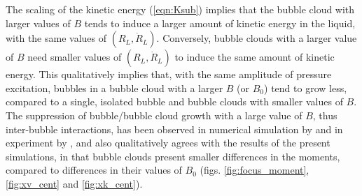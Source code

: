 \documentclass{jfm}
\begin{document}
The scaling of the kinetic energy (\ref{eqn:Ksub}) implies that the bubble cloud with larger values of $B$ tends to induce a larger amount of kinetic energy in the liquid, with the same values of $(R_L,\dot{R}_L)$.
Conversely, bubble clouds with a larger value of $B$ need smaller values of $(R_L,\dot{R}_L)$ to induce the same amount of kinetic energy. 
This qualitatively implies that, with the same amplitude of pressure excitation, bubbles in a bubble cloud with a larger $B$ (or $B_0$) tend to grow less, compared to a single, isolated bubble and bubble clouds with smaller values of $B$.
The suppression of bubble/bubble cloud growth with a large value of $B$, thus inter-bubble interactions, has been observed in numerical simulation by \citet{Wang99} and in experiment by \citet{Bremond06}, and also qualitatively agrees with the results of the present simulations, in that bubble clouds present smaller differences in the moments, compared to differences in their values of $B_0$ (figs. \ref{fig:focus_moment}, \ref{fig:xv_cent} and \ref{fig:xk_cent}).
\end{document}
